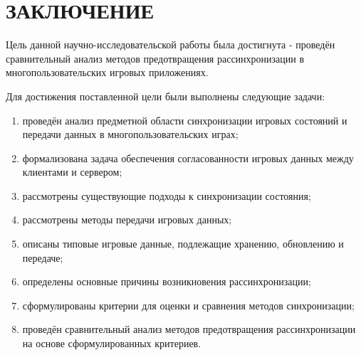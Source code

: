 \chapter*{ЗАКЛЮЧЕНИЕ}

Цель данной научно-исследовательской работы была достигнута - проведён сравнительный анализ методов предотвращения рассинхронизации в многопользовательских игровых приложениях.

Для достижения поставленной цели были выполнены следующие задачи:

\begin{enumerate}
\item проведён анализ предметной области синхронизации игровых состояний и передачи данных в многопользовательских играх;
\item формализована задача обеспечения согласованности игровых данных между клиентами и сервером;
\item рассмотрены существующие подходы к синхронизации состояния;
\item рассмотрены методы передачи игровых данных;
\item описаны типовые игровые данные, подлежащие хранению, обновлению и передаче;
\item определены основные причины возникновения рассинхронизации;
\item сформулированы критерии для оценки и сравнения методов синхронизации;
\item проведён сравнительный анализ методов предотвращения рассинхронизации на основе сформулированных критериев.
\end{enumerate}
